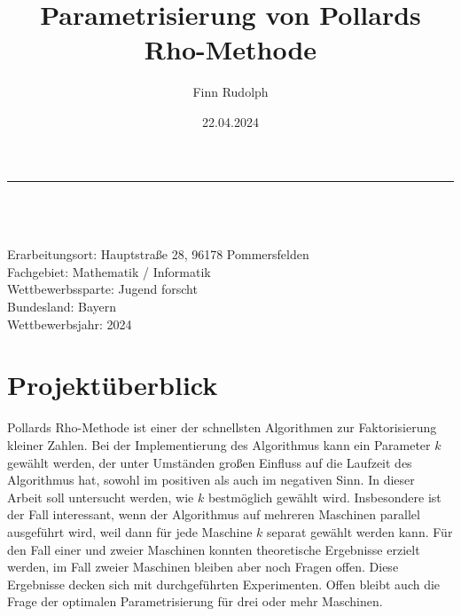 \documentclass[a4paper, 11pt, ngerman]{article}
\title{Parametrisierung von Pollards Rho-Methode}
\author{Finn Rudolph}
\date{22.04.2024}
\theoremstyle{definition}
\theoremstyle{plain}
\theoremstyle{remark}
\begin{document}
\titleformat{\subsection}[runin]{\bfseries}{\thesubsection}{0.5em}{}

\setcounter{tocdepth}{1}

\begin{titlepage}

    \noindent\rule{\textwidth}{0.4pt}

    \makeatletter
    \begin{flushleft}
        \textbf{\LARGE{\@title}} \\
        \vspace{1.5em}
        \@author \\
        \@date \\
        \vspace{1em}
        Erarbeitungsort: Hauptstraße 28, 96178 Pommersfelden \\
        Fachgebiet: Mathematik / Informatik \\
        Wettbewerbssparte: Jugend forscht \\
        Bundesland: Bayern \\
        Wettbewerbsjahr: 2024
    \end{flushleft}

    \vspace{0.2em}

    \section*{Projektüberblick}

    Pollards Rho-Methode ist einer der schnellsten Algorithmen zur Faktorisierung kleiner Zahlen. Bei der Implementierung des Algorithmus kann ein Parameter $k$ gewählt werden, der unter Umständen großen Einfluss auf die Laufzeit des Algorithmus hat, sowohl im positiven als auch im negativen Sinn. In dieser Arbeit soll untersucht werden, wie $k$ bestmöglich gewählt wird. Insbesondere ist der Fall interessant, wenn der Algorithmus auf mehreren Maschinen parallel ausgeführt wird, weil dann für jede Maschine $k$ separat gewählt werden kann. Für den Fall einer und zweier Maschinen konnten theoretische Ergebnisse erzielt werden, im Fall zweier Maschinen bleiben aber noch Fragen offen. Diese Ergebnisse decken sich mit durchgeführten Experimenten. Offen bleibt auch die Frage der optimalen Parametrisierung für drei oder mehr Maschinen.

    \vspace{0.5em}

    \tableofcontents

    \thispagestyle{empty}
\end{titlepage}
\end{document}
